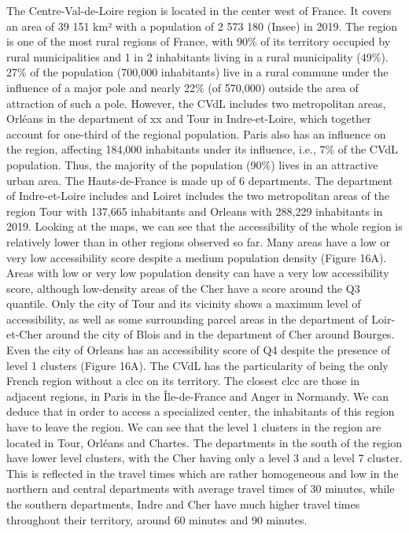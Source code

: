 The Centre-Val-de-Loire region is located in the center west of France. It covers an area of 39 151 km² with a population of 2 573 180 (Insee) in 2019.
The region is one of the most rural regions of France, with 90\% of its territory occupied by rural municipalities and 1 in 2 inhabitants living in a rural municipality (49\%). 27\% of the population (700,000 inhabitants) live in a rural commune under the influence of a major pole and nearly 22\% (of 570,000) outside the area of attraction of such a pole.
However, the CVdL includes two metropolitan areas, Orléans in the department of xx and Tour in Indre-et-Loire, which together account for one-third of the regional population. Paris also has an influence on the region, affecting 184,000 inhabitants under its influence, i.e., 7\% of the CVdL population. Thus, the majority of the population (90\%) lives in an attractive urban area. The Hauts-de-France is made up of 6 departments. The department of Indre-et-Loire includes and Loiret includes the two metropolitan areas of the region Tour with 137,665 inhabitants and Orleans with 288,229 inhabitants in 2019. Looking at the maps, we can see that the accessibility of the whole region is relatively lower than in other regions observed so far. Many areas have a low or very low accessibility score despite a medium population density (Figure 16A). Areas with low or very low population density can have a very low accessibility score, although low-density areas of the Cher have a score around the Q3 quantile. Only the city of Tour and its vicinity shows a maximum level of accessibility, as well as some surrounding parcel areas in the department of Loir-et-Cher around the city of Blois and in the department of Cher around Bourges. Even the city of Orleans has an accessibility score of Q4 despite the presence of level 1 clusters (Figure 16A). The CVdL has the particularity of being the only French region without a \ac{clcc} on its territory. The closest \ac{clcc} are those in adjacent regions, in Paris in the Île-de-France and Anger in Normandy. We can deduce that in order to access a specialized center, the inhabitants of this region have to leave the region.  We can see that the level 1 clusters in the region are located in Tour, Orléans and Chartes. The departments in the south of the region have lower level clusters, with the Cher having only a level 3 and a level 7 cluster. This is reflected in the travel times which are rather homogeneous and low in the northern and central departments with average travel times of 30 minutes, while the southern departments, Indre and Cher have much higher travel times throughout their territory, around 60 minutes and 90 minutes.

